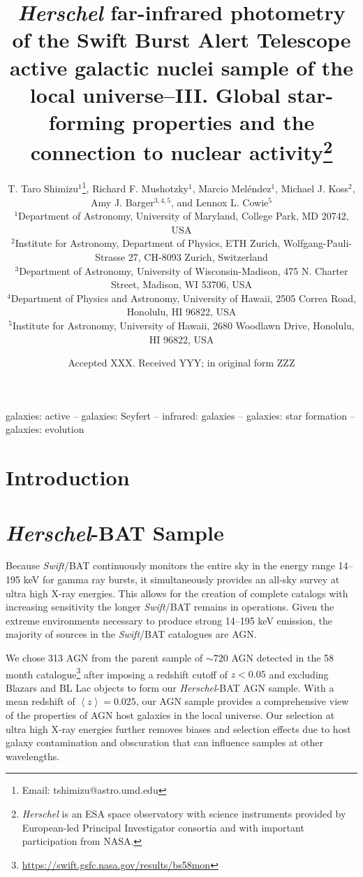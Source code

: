 \documentclass[fleqn, usenatbib]{mnras}
\title[\emph{Herschel}-BAT Sample: AGN-SF Connection]{\emph{Herschel} far-infrared photometry of the Swift Burst Alert
Telescope active galactic nuclei sample of the local universe--III. Global star-forming properties and the connection to nuclear activity\thanks{{\it Herschel} is an ESA space observatory with science instruments provided by European-led Principal Investigator consortia and with important participation from NASA.}}
\author[T. T. Shimizu]{T. Taro Shimizu$^{1}$\thanks{Email: tshimizu@astro.umd.edu}, Richard F. Mushotzky$^1$, Marcio Mel\'endez$^1$, Michael J. Koss$^{2}$, \newauthor Amy J. Barger$^{3,4,5}$, and Lennox L. Cowie$^{5}$\\
$^{1}$Department of Astronomy, University of Maryland, College Park, MD 20742, USA\\
$^{2}$Institute for Astronomy, Department of Physics, ETH Zurich, Wolfgang-Pauli-Strasse 27, CH-8093 Zurich, Switzerland\\
$^{3}$Department of Astronomy, University of Wisconsin-Madison, 475 N. Charter Street, Madison, WI 53706, USA\\
$^{4}$Department of Physics and Astronomy, University of Hawaii, 2505 Correa Road, Honolulu, HI 96822, USA\\
$^{5}$Institute for Astronomy, University of Hawaii, 2680 Woodlawn Drive, Honolulu, HI 96822, USA}
\date{Accepted XXX. Received YYY; in original form ZZZ}
\newcommand{\herschel}{\emph{Herschel}}
\newcommand{\swift}{\textit{Swift}}
\begin{document}
\label{firstpage}
\pagerange{\pageref{firstpage}--\pageref{lastpage}}
\maketitle

\begin{abstract}

\end{abstract}

\begin{keywords}
galaxies: active -- galaxies: Seyfert -- infrared: galaxies -- galaxies: star formation -- galaxies: evolution 
\end{keywords}



\section{Introduction}

\section{\herschel-BAT Sample}
Because \swift/BAT continuously monitors the entire sky in the energy range 14--195 keV for gamma ray bursts, it simultaneously provides an all-sky survey at ultra high X-ray energies. This allows for the creation of complete catalogs with increasing sensitivity the longer \swift/BAT remains in operations. Given the extreme environments necessary to produce strong 14--195 keV emission, the majority of sources in the \swift/BAT catalogues are AGN.

We chose 313 AGN from the parent sample of $\sim720$ AGN detected in the 58 month catalogue\footnote{\url{https://swift.gsfc.nasa.gov/results/bs58mon}} after imposing a redshift cutoff of $z<0.05$ and excluding Blazars and BL Lac objects to form our \herschel-BAT AGN sample. With a mean redshift of $\left<z\right> = 0.025$, our AGN sample provides a comprehensive view of the properties of AGN host galaxies in the local universe. Our selection at ultra high X-ray energies further removes biases and selection effects due to host galaxy contamination and obscuration \citep{Mushotzky:2004gf} that can influence samples at other wavelengths.   
\end{document}
